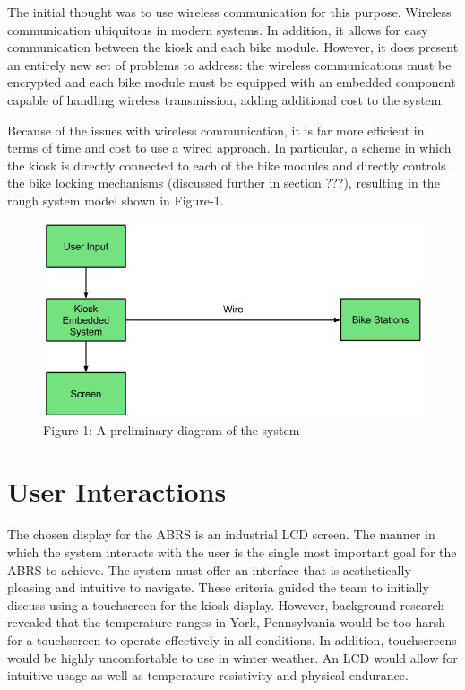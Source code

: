 \documentclass[11pt,a4paper,onesides]{report}
\begin{document}
The initial thought was to use wireless communication for this purpose.  Wireless communication ubiquitous in modern systems.  In addition, it allows for easy communication between the kiosk and each bike module.  However, it does present an entirely new set of problems to address: the wireless communications must be encrypted and each bike module must be equipped with an embedded component capable of handling wireless transmission, adding additional cost to the system.  

Because of the issues with wireless communication,  it is far more efficient in terms of time and cost to use a wired approach.  In particular, a scheme in which the kiosk is directly connected to each of the bike modules and directly controls the bike locking mechanisms (discussed further in section ???), resulting in the rough system model shown in Figure-1.  


\begin{figure}[h]
	\begin{center}
		\includegraphics[scale = 0.6]{initial-diagram}
	\end{center}
\caption{Figure-1:  A preliminary diagram of the system}

\end{figure}

\section{User Interactions}

The chosen display for the ABRS is an industrial LCD screen.  The manner in which the system interacts with the user is the single most important goal for the ABRS to achieve.  The system must offer an interface that is aesthetically pleasing and intuitive to navigate.  These criteria guided the team to initially discuss using a touchscreen for the kiosk display.  However, background research revealed that the temperature ranges in York, Pennsylvania would be too harsh for a touchscreen to operate effectively in all conditions.  In addition, touchscreens would be highly uncomfortable to use in winter weather.  An LCD would allow for intuitive usage as well as temperature resistivity and physical endurance.
\end{document}
